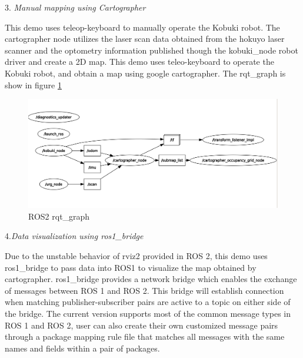 \documentclass[letterpaper, 10 pt, conference]{ieeeconf}  %
\begin{document}
3. \textit{Manual mapping using Cartographer}\par\vspace{5pt}
This demo uses teleop-keyboard to manually operate the Kobuki robot. The cartographer node utilizes the laser scan data obtained from the hokuyo laser scanner and the optometry information published though the kobuki\_node robot driver and create a 2D map. 
This demo uses teleo-keyboard to operate the Kobuki robot, and obtain a map using google cartographer. The rqt\_graph is show in figure \ref{fig:rqt}\par\vspace{5pt}
\begin{figure}[ht]
  \includegraphics[width=\linewidth]{qrt_graph.png}
  \caption{ROS2 rqt\_graph} 
  \label{fig:rqt}
\end{figure}
4.\textit{Data visualization using ros1\_bridge}\par\vspace{5pt} 
Due to the unstable behavior of rviz2 provided in ROS 2, this demo uses ros1\_bridge to pass data into ROS1 to visualize the map obtained by cartographer. ros1\_bridge provides a network bridge which enables the exchange of messages between ROS 1 and ROS 2. This bridge will establish connection when matching publisher-subscriber pairs are active to a topic on either side of the bridge\cite{c4}. The current version supports most of the common message types in ROS 1 and ROS 2, user can also create their own customized message pairs through a package mapping rule file that matches all messages with the same names and fields within a pair of packages.\par\vspace{5pt} 
\end{document}
